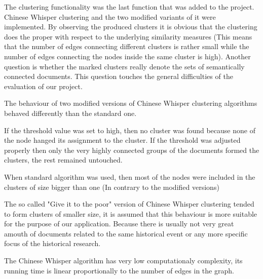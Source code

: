 The clustering functionality was the last function that was added to the project. Chinese Whisper clustering and the two modified variants of it were implemented. By observing the produced clusters it is obvious that the clustering does the proper with respect to the underlying similarity measures (This means that the number of edges connecting different clusters is rather small while the number of edges connecting the nodes inside the same cluster is high). Another question is whether the marked clusters really denote the sets of semantically connected documents. This question touches the general difficulties of the evaluation of our project. 

The behaviour of two modified versions of Chinese Whisper clustering algorithms behaved differently than the standard one. 

If the threshold value was set to high, then no cluster was found because none of the node hanged its assignment to the cluster. If the threshold was adjusted properly then only the very highly connected groups of the documents formed the clusters, the rest remained untouched. 

When standard algorithm was used, then most of the nodes were included in the clusters of size bigger than one (In contrary to the modified versions) 

The so called "Give it to the poor" version of Chinese Whisper clustering tended to form clusters of smaller size, it is assumed that this behaviour is more suitable for the purpose of our application. Because there is usually not very great amouth of documents related to the same historical event or any more specific focus of the historical research. 

The Chinese Whisper algorithm has very low computationaly complexity, its running time is linear proportionally to the number of edges in the graph. 

